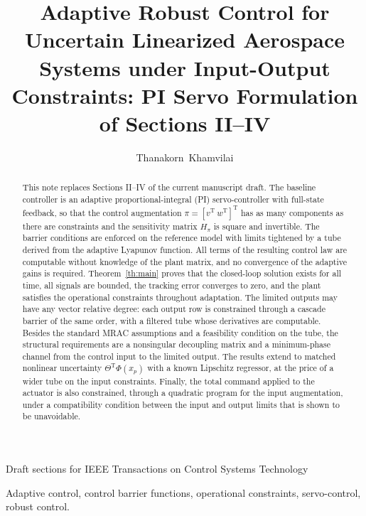 \documentclass[lettersize,journal]{IEEEtran}
\newcommand{\T}{\mathrm{T}}
\begin{document}
\title{Adaptive Robust Control for Uncertain Linearized Aerospace Systems under Input-Output Constraints: PI Servo Formulation of Sections II--IV}

\author{Thanakorn~Khamvilai}

%
{Draft sections for IEEE Transactions on Control Systems Technology}

\maketitle

\begin{abstract}
This note replaces Sections II--IV of the current manuscript draft. The baseline controller is an adaptive proportional-integral (PI) servo-controller with full-state feedback, so that the control augmentation $\pi=[v^\T\ w^\T]^\T$ has as many components as there are constraints and the sensitivity matrix $H_\pi$ is square and invertible. The barrier conditions are enforced on the reference model with limits tightened by a tube derived from the adaptive Lyapunov function. All terms of the resulting control law are computable without knowledge of the plant matrix, and no convergence of the adaptive gains is required. Theorem~\ref{th:main} proves that the closed-loop solution exists for all time, all signals are bounded, the tracking error converges to zero, and the plant satisfies the operational constraints throughout adaptation. The limited outputs may have any vector relative degree: each output row is constrained through a cascade barrier of the same order, with a filtered tube whose derivatives are computable. Besides the standard MRAC assumptions and a feasibility condition on the tube, the structural requirements are a nonsingular decoupling matrix and a minimum-phase channel from the control input to the limited output. The results extend to matched nonlinear uncertainty $\Theta^\T\Phi(x_p)$ with a known Lipschitz regressor, at the price of a wider tube on the input constraints. Finally, the total command applied to the actuator is also constrained, through a quadratic program for the input augmentation, under a compatibility condition between the input and output limits that is shown to be unavoidable.
\end{abstract}

\begin{IEEEkeywords}
Adaptive control, control barrier functions, operational constraints, servo-control, robust control.
\end{IEEEkeywords}
\end{document}
